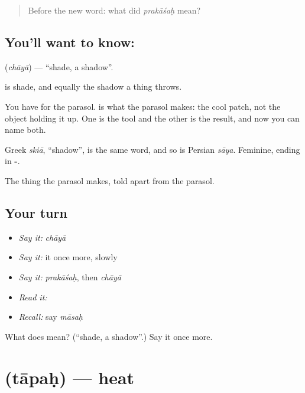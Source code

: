 \label{lesson:SA-C46-shade}



\begin{quote}
Before the new word: what did \emph{prakāśaḥ} mean?
\end{quote}

\subsection*{You'll want to know: }
\textbf{} (\emph{chāyā}) — \textquotedblleft{}shade, a shadow\textquotedblright{}.

\textbf{} is shade, and equally the shadow a thing throws.

You have  for the parasol. \textbf{} is what the parasol makes: the cool patch, not the object holding it up. One is the tool and the other is the result, and now you can name both.

Greek \emph{skiā}, \textquotedblleft{}shadow\textquotedblright{}, is the same word, and so is Persian \emph{sāya}. Feminine, ending in \textbf{-}.

\begin{grammarlens}[title={What you've built}]
The thing the parasol makes, told apart from the parasol.
\end{grammarlens}

\subsection*{Your turn}
\begin{itemize}
\raggedright
  \item \emph{Say it:} \emph{chāyā}
  \item \emph{Say it:} it once more, slowly
  \item \emph{Say it:} \emph{prakāśaḥ}, then \emph{chāyā}
  \item \emph{Read it:} \textbf{}
  \item \emph{Recall:} say \emph{māsaḥ}
\end{itemize}

\begin{tcolorbox}[breakable,colback=teal!4,colframe=teal!35!black,title={Before you move on}]
What does  mean? (\textquotedblleft{}shade, a shadow\textquotedblright{}.) Say it once more.
\end{tcolorbox}
\section[\texorpdfstring{\sk{तापः} (tāpaḥ)}{तापः (tāpaḥ)}]{ (tāpaḥ) — heat}

